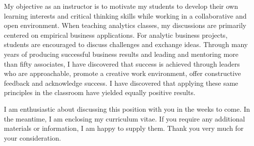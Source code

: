 \vspace{2.0ex}

My objective as an instructor is to motivate my students to develop their own learning interests and critical thinking skills while working in a collaborative and open environment.  When teaching analytics classes, my discussions are primarily centered on empirical business applications.  For analytic business projects, students are encouraged to discuss challenges and exchange ideas.  Through many years of producing successful business results and leading and mentoring more than fifty associates, I have discovered that success is achieved through leaders who are approachable, promote a creative work environment, offer constructive feedback and acknowledge success.  I have discovered that applying these same principles in the classroom have yielded equally positive results.  \\

\vspace{2.0ex}

I am enthusiastic about discussing this position with you in the weeks to come. In the meantime, I am enclosing my curriculum vitae.  If you require any additional materials or information, I am happy to supply them. Thank you very much for your consideration. \\


